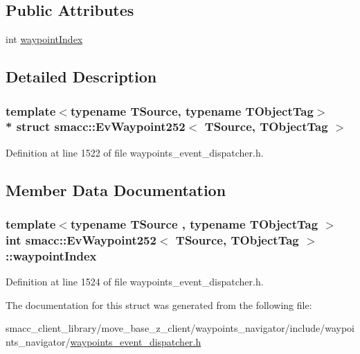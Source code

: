 \subsection*{Public Attributes}
\begin{DoxyCompactItemize}
\item 
int \hyperlink{structsmacc_1_1EvWaypoint252_a69dc04e69fefab3c040995845d653564}{waypoint\+Index}
\end{DoxyCompactItemize}


\subsection{Detailed Description}
\subsubsection*{template$<$typename T\+Source, typename T\+Object\+Tag$>$\\*
struct smacc\+::\+Ev\+Waypoint252$<$ T\+Source, T\+Object\+Tag $>$}



Definition at line 1522 of file waypoints\+\_\+event\+\_\+dispatcher.\+h.



\subsection{Member Data Documentation}
\subsubsection[{\texorpdfstring{waypoint\+Index}{waypointIndex}}]{\setlength{\rightskip}{0pt plus 5cm}template$<$typename T\+Source , typename T\+Object\+Tag $>$ int {\bf smacc\+::\+Ev\+Waypoint252}$<$ T\+Source, T\+Object\+Tag $>$\+::waypoint\+Index}\hypertarget{structsmacc_1_1EvWaypoint252_a69dc04e69fefab3c040995845d653564}{}\label{structsmacc_1_1EvWaypoint252_a69dc04e69fefab3c040995845d653564}


Definition at line 1524 of file waypoints\+\_\+event\+\_\+dispatcher.\+h.



The documentation for this struct was generated from the following file\+:\begin{DoxyCompactItemize}
\item 
smacc\+\_\+client\+\_\+library/move\+\_\+base\+\_\+z\+\_\+client/waypoints\+\_\+navigator/include/waypoints\+\_\+navigator/\hyperlink{waypoints__event__dispatcher_8h}{waypoints\+\_\+event\+\_\+dispatcher.\+h}\end{DoxyCompactItemize}

